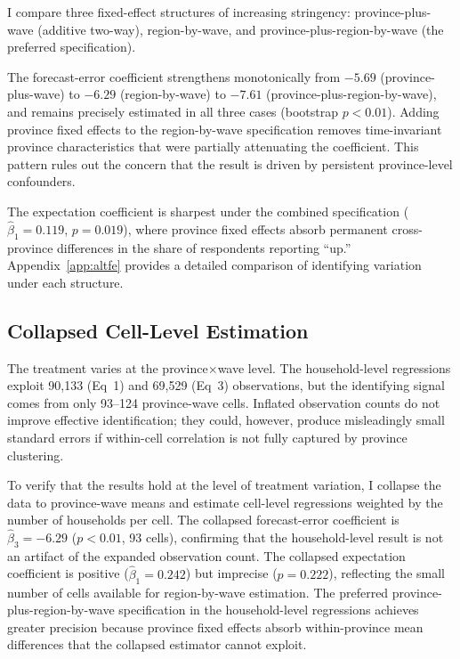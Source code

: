 I compare three fixed-effect structures of increasing
stringency: province-plus-wave (additive two-way),
region-by-wave, and province-plus-region-by-wave (the
preferred specification).

The forecast-error coefficient strengthens monotonically
from $-5.69$ (province-plus-wave) to $-6.29$
(region-by-wave) to $-7.61$ (province-plus-region-by-wave),
and remains precisely estimated in all three cases
(bootstrap $p < 0.01$).
Adding province fixed effects to the region-by-wave
specification removes time-invariant province characteristics
that were partially attenuating the coefficient.
This pattern rules out the concern that the result is driven
by persistent province-level confounders.

The expectation coefficient is sharpest under the combined
specification ($\hat{\beta}_1 = 0.119$, $p = 0.019$), where
province fixed effects absorb permanent cross-province
differences in the share of respondents reporting ``up.''
Appendix~\ref{app:altfe} provides a detailed comparison of
identifying variation under each structure.

\subsection{Collapsed Cell-Level Estimation}%
\label{sec:collapsed}

The treatment varies at the province$\times$wave level.
The household-level regressions exploit 90,133 (Eq~1) and
69,529 (Eq~3) observations, but the identifying signal comes
from only 93--124 province-wave cells.
Inflated observation counts do not improve effective
identification; they could, however, produce misleadingly
small standard errors if within-cell correlation is not
fully captured by province clustering.

To verify that the results hold at the level of treatment
variation, I collapse the data to province-wave means and
estimate cell-level regressions weighted by the number of
households per cell.
The collapsed forecast-error coefficient is
$\hat{\beta}_3 = -6.29$ ($p < 0.01$, 93 cells), confirming
that the household-level result is not an artifact of the
expanded observation count.
The collapsed expectation coefficient is positive
($\hat{\beta}_1 = 0.242$) but imprecise ($p = 0.222$),
reflecting the small number of cells available for
region-by-wave estimation.
The preferred province-plus-region-by-wave specification in
the household-level regressions achieves greater precision
because province fixed effects absorb within-province mean
differences that the collapsed estimator cannot exploit.

